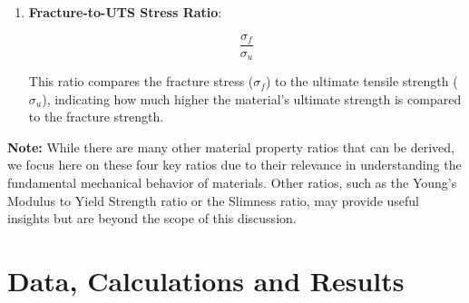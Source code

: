\documentclass{article}
\begin{document}
\begin{enumerate}
    \item \textbf{Fracture-to-UTS Stress Ratio}:\\[8pt]
    \begin{minipage}{0.3\textwidth}
        \begin{equation}
            \frac{\sigma_f}{\sigma_u}
        \end{equation}
    \end{minipage}\hfill
    \begin{minipage}{0.6\textwidth}
        This ratio compares the fracture stress (\(\sigma_f\)) to the ultimate tensile strength (\(\sigma_u\)), indicating how much higher the material's ultimate strength is compared to the fracture strength.
    \end{minipage}
    
\end{enumerate}
\vspace{1em}
\textbf{Note:} While there are many other material property ratios that can be derived, we focus here on these four key ratios due to their relevance in understanding the fundamental mechanical behavior of materials. Other ratios, such as the Young’s Modulus to Yield Strength ratio or the Slimness ratio, may provide useful insights but are beyond the scope of this discussion.

        
    \newpage\vspace*{-20pt}
    
    \section{Data, Calculations and Results}
    
\end{document}
